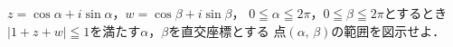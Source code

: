 \documentclass[../../main.tex]{subfiles}
\begin{document}
$z=\cos\alpha+i\sin\alpha$，$w=\cos\beta+i\sin\beta$，
$0\leqq\alpha\leqq2\pi$，$0\leqq\beta\leqq2\pi$とするとき
$|1+z+w|\leqq1$を満たす$\alpha$，$\beta$を直交座標とする
点$(\alpha, \, \beta)$の範囲を図示せよ．
\end{document}
